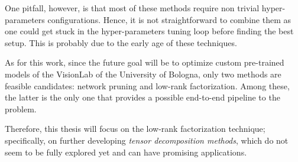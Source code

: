 One pitfall, however, is that most of these methods require non trivial hyper-parameters configurations. Hence, it is not straightforward to combine them as one could get stuck in the hyper-parameters tuning loop before finding the best setup. This is probably due to the early age of these techniques. 

As for this work, since the future goal will be to optimize custom pre-trained models of the VisionLab of the University of Bologna, only two methods are feasible candidates: network pruning and low-rank factorization. Among these, the latter is the only one that provides a possible end-to-end pipeline to the problem. 
\newline 

Therefore, this thesis will focus on the low-rank factorization technique; specifically, on further developing \emph{tensor decomposition methods}, which do not seem to be fully explored yet and can have promising applications. 